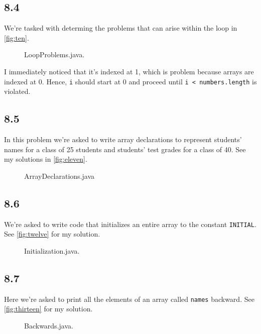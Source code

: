 \documentclass[leqno, 11pt]{article}
\begin{document}
\subsection*{8.4}
We're tasked with determing the problems that can arise within the loop in \autoref{fig:ten}.
\begin{figure}[h!]
  \centering
  
  \caption{LoopProblems.java.}
  \label{fig:ten}
\end{figure}
I immediately noticed that it's indexed at 1, which is problem because arrays are indexed at 0. Hence, \texttt{i} should start at 0 and proceed until \texttt{i < numbers.length} is violated.
\subsection*{8.5}
In this problem we're asked to write array declarations to represent students' names for a class of 25 students and students' test grades for a class of 40. See my solutions in \autoref{fig:eleven}.
\begin{figure}[h!]
  \centering
  
  \caption{ArrayDeclarations.java}
  \label{fig:eleven}
\end{figure}
\subsection*{8.6}
We're asked to write code that initializes an entire array to the constant \texttt{INITIAL}. See \autoref{fig:twelve} for my solution.
\begin{figure}[h!]
  \centering
  
  \caption{Initialization.java.}
  \label{fig:twelve}
\end{figure}
\subsection*{8.7}
Here we're asked to print all the elements of an array called \texttt{names} backward. See \autoref{fig:thirteen} for my solution.
\begin{figure}[h!]
  \centering
  
  \caption{Backwards.java.}
  \label{fig:thirteen}
\end{figure}
\end{document}
